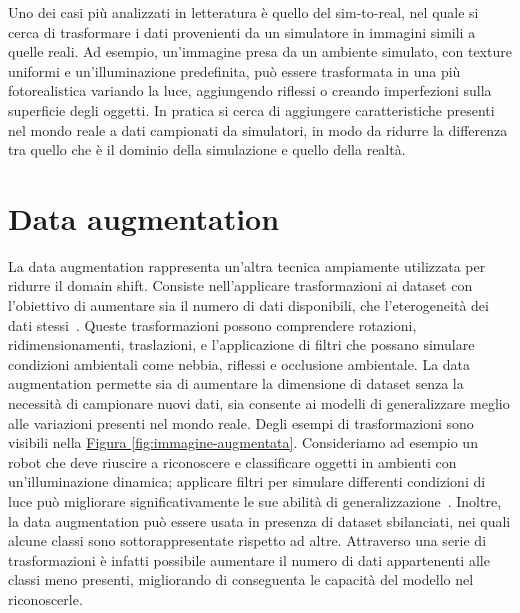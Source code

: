 \documentclass[12pt]{report}
\begin{document}
Uno dei casi più analizzati in letteratura è quello del sim-to-real, nel quale si cerca di trasformare i dati provenienti da un simulatore in immagini simili a quelle reali. Ad esempio, un'immagine presa da un ambiente simulato, con texture uniformi e un'illuminazione predefinita, può essere trasformata in una più fotorealistica variando la luce, aggiungendo riflessi o creando imperfezioni sulla superficie degli oggetti. In pratica si cerca di aggiungere caratteristiche presenti nel mondo reale a dati campionati da simulatori, in modo da ridurre la differenza tra quello che è il dominio della simulazione e quello della realtà.

\section{Data augmentation}
\label{sec:augmentation}

La data augmentation rappresenta un'altra tecnica ampiamente utilizzata per ridurre il domain shift. Consiste nell'applicare trasformazioni ai dataset con l'obiettivo di aumentare sia il numero di dati disponibili, che l'eterogeneità dei dati stessi~\cite{Shorten2019}. Queste trasformazioni possono comprendere rotazioni, ridimensionamenti, traslazioni, e l'applicazione di filtri che possano simulare condizioni ambientali come nebbia, riflessi e occlusione ambientale. La data augmentation permette sia di aumentare la dimensione di dataset senza la necessità di campionare nuovi dati, sia consente ai modelli di generalizzare meglio alle variazioni presenti nel mondo reale. Degli esempi di trasformazioni sono visibili nella \hyperref[fig:immagine-augmentata]{Figura \ref{fig:immagine-augmentata}}. Consideriamo ad esempio un robot che deve riuscire a riconoscere e classificare oggetti in ambienti con un'illuminazione dinamica; applicare filtri per simulare differenti condizioni di luce può migliorare significativamente le sue abilità di generalizzazione~\cite{NEURIPS2021_fb4c4860}. Inoltre, la data augmentation può essere usata in presenza di dataset sbilanciati, nei quali alcune classi sono sottorappresentate rispetto ad altre. Attraverso una serie di trasformazioni è infatti possibile aumentare il numero di dati appartenenti alle classi meno presenti, migliorando di conseguenta le capacità del modello nel riconoscerle.
\end{document}

